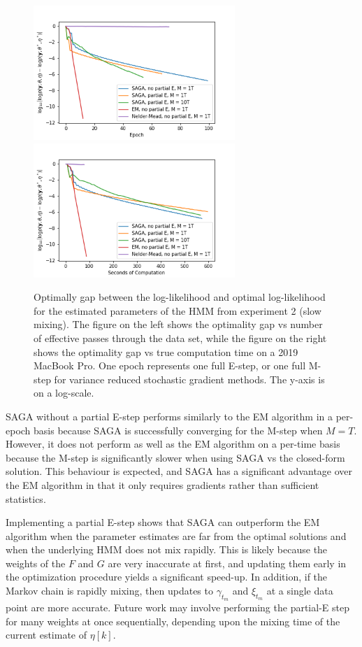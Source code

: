 %
\begin{figure}
    \centering
    \includegraphics[width=3in]{../plt/log-like_v_epoch_exp_2.png}
    \includegraphics[width=3in]{../plt/log-like_v_time_exp_2.png}
    \caption{Optimally gap between the log-likelihood and optimal log-likelihood for the estimated parameters of the HMM from experiment 2 (slow mixing). The figure on the left shows the optimality gap vs number of effective passes through the data set, while the figure on the right shows the optimality gap vs true computation time on a 2019 MacBook Pro. One epoch represents one full E-step, or one full M-step for variance reduced stochastic gradient methods. The y-axis is on a log-scale.}
    \label{fig:exp2_ll}
\end{figure}

SAGA without a partial E-step performs similarly to the EM algorithm in a per-epoch basis because SAGA is successfully converging for the M-step when $M = T$. However, it does not perform as well as the EM algorithm on a per-time basis because the M-step is significantly slower when using SAGA vs the closed-form solution. This behaviour is expected, and SAGA has a significant advantage over the EM algorithm in that it only requires gradients rather than sufficient statistics.

Implementing a partial E-step shows that SAGA can outperform the EM algorithm when the parameter estimates are far from the optimal solutions and when the underlying HMM does not mix rapidly. This is likely because the weights of the $F$ and $G$ are very inaccurate at first, and updating them early in the optimization procedure yields a significant speed-up. In addition, if the Markov chain is rapidly mixing, then updates to $\gamma_{t_m}$ and $\xi_{t_m}$ at a single data point are more accurate. Future work may involve performing the partial-E step for many weights at once sequentially, depending upon the mixing time of the current estimate of $\eta[k]$.